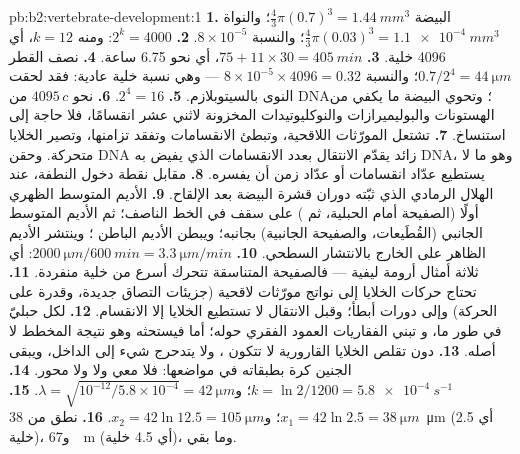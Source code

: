 \begin{solution}{pb:b2:vertebrate-development:1}
\textbf{1.} البيضة $\tfrac43\pi(0.7)^{3} = \qty{1.44}{mm^3}$؛ والنواة
$\tfrac43\pi(0.03)^{3} = \qty{1.1e-4}{mm^3}$؛ والنسبة $8\times
10^{-5}$.
\textbf{2.} $2^{k} = 4000$: ومنه $k = 12$، أي 4096 خلية.
\textbf{3.} $75 + 11\times 30 = \qty{405}{min}$، أي نحو 6.75 ساعة.
\textbf{4.} نصف القطر $0.7/2^{4} = \qty{44}{\micro m}$؛ والنسبة $8\times
10^{-5}\times 4096 = 0.32$ --- وهي نسبة خلية عادية: فقد
لحقت النوى بالسيتوبلازم.
\textbf{5.} $2^{4} = 16$.
\textbf{6.} نحو $4095\,c$ من DNA؛ وتحوي البيضة ما يكفي من
الهستونات والبوليميرازات والنوكليوتيدات المخزونة لاثني عشر انقسامًا، فلا
حاجة إلى استنساخ.
\textbf{7.} تشتعل المورّثات اللاقحية، وتبطئ الانقسامات وتفقد
تزامنها، وتصير الخلايا متحركة. وحقن DNA زائد يقدّم
الانتقال بعدد الانقسامات الذي يفيض به DNA،
وهو ما لا يستطيع عدّاد انقسامات أو عدّاد زمن أن يفسره.
\textbf{8.} مقابل نقطة دخول النطفة، عند الهلال الرمادي
الذي ثبّته دوران قشرة البيضة بعد الإلقاح.
\textbf{9.} الأديم المتوسط الظهري أولًا (الصفيحة أمام الحبلية، ثم )
على سقف  في الخط الناصف؛ ثم الأديم المتوسط الجانبي
(القُطَيعات، والصفيحة الجانبية) بجانبه؛ ويبطن الأديم الباطن
؛ وينتشر الأديم الظاهر على الخارج بالانتشار السطحي.
\textbf{10.} $\qty{2000}{\micro m}/\qty{600}{min} = \qty{3.3}{\micro
m/min}$: أي ثلاثة أمثال أرومة ليفية --- فالصفيحة المتناسقة تتحرك
أسرع من خلية منفردة.
\textbf{11.} تحتاج حركات الخلايا إلى نواتج مورّثات لاقحية (جزيئات
التصاق جديدة، وقدرة على الحركة) وإلى دورات أبطأ؛ وقبل
الانتقال لا تستطيع الخلايا إلا الانقسام.
\textbf{12.} لكل حبليّ  في طور ما، و
تبني الفقاريات العمود الفقري حوله؛ أما 
فيستحثه  وهو نتيجة المخطط لا أصله.
\textbf{13.} دون تقلص الخلايا القارورية لا تتكون ،
ولا يتدحرج شيء إلى الداخل، ويبقى الجنين كرة بطبقاته في
مواضعها: فلا معي ولا  ولا محور.
\textbf{14.} $k = \ln 2/1200 = \qty{5.8e-4}{s^{-1}}$؛ و$\lambda =
\sqrt{10^{-12}/5.8\times 10^{-4}} = \qty{42}{\micro m}$.
\textbf{15.} $x_1 = 42\ln 2.5 = \qty{38}{\micro m}$؛ و$x_2 = 42\ln 12.5
= \qty{105}{\micro m}$.
\textbf{16.} نطق من \qty{38}{\micro m} (أي 2.5 خلية)، و\qty{67}{\micro
m} (أي 4.5 خلية)، وما بقي.

\end{solution}
